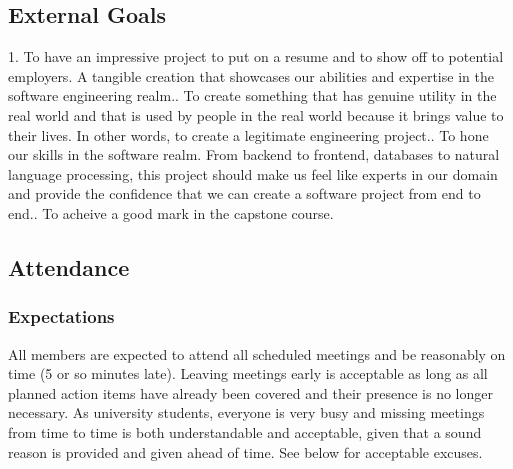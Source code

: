 \documentclass{article}
\begin{document}
\subsection*{External Goals}


\par{1. To have an impressive project to put on a resume and to show off to potential employers. A tangible creation that showcases our abilities
and expertise in the software engineering realm.\newline{}. To create something that has genuine utility in the real world and that is used by people in the real world because it brings value to their lives.
In other words, to create a legitimate engineering project.\newline{}. To hone our skills in the software realm. From backend to frontend, databases to natural language processing, this project should make us feel like experts 
in our domain and provide the confidence that we can create a software project from end to end.\newline{}. To acheive a good mark in the capstone course.}

\subsection*{Attendance}

\subsubsection*{Expectations}


\par{All members are expected to attend all scheduled meetings and be reasonably on time (5 or so minutes late). Leaving meetings early is acceptable as long
as all planned action items have already been covered and their presence is no longer necessary. As university students, everyone is very busy and missing
meetings from time to time is both understandable and acceptable, given that a sound reason is provided and given ahead of time. See below for acceptable excuses.}
\end{document}
